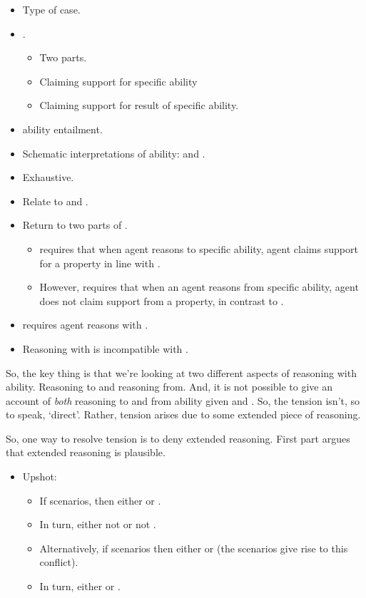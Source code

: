 \begin{itemize}
\item Type of case.
\item \gsi{-}.
  \begin{itemize}
  \item Two parts.
  \item Claiming support for specific ability
  \item Claiming support for result of specific ability.
  \end{itemize}
\item ability entailment.
\item Schematic interpretations of ability: \AR{} and \WR{}.
\item Exhaustive.
\item Relate to \ESU{} and \EAS{}.
\item Return to two parts of \gsi{}.
  \begin{itemize}
  \item \ESU{} requires that when agent reasons to specific ability, agent claims support for a property in line with \AR{}.
  \item However, \nI{} requires that when an agent reasons from specific ability, agent does not claim support from a property, in contrast to \AR{}.
  \end{itemize}
\item \ESU{} requires agent reasons with \AR{}.
\item Reasoning with \AR{} is incompatible with \nI{}.
\end{itemize}

So, the key thing is that we're looking at two different aspects of reasoning with ability.
Reasoning to and reasoning from.
And, it is not possible to give an account of \emph{both} reasoning to and from ability given \ESU{} and \nI{}.
So, the tension isn't, so to speak, `direct'.
Rather, tension arises due to some extended piece of reasoning.

So, one way to resolve tension is to deny extended reasoning.
First part argues that extended reasoning is plausible.


\begin{itemize}
\item Upshot:
  \begin{itemize}
  \item If scenarios, then either \AR{} or \WR{}.
  \item In turn, either not \nI{} or not \ESU{}.
  \item Alternatively, if scenarios then either \ESU{} or \nI{} (the scenarios give rise to this conflict).
  \item In turn, either \AR{} or \WR{}.
  \end{itemize}
\end{itemize}


